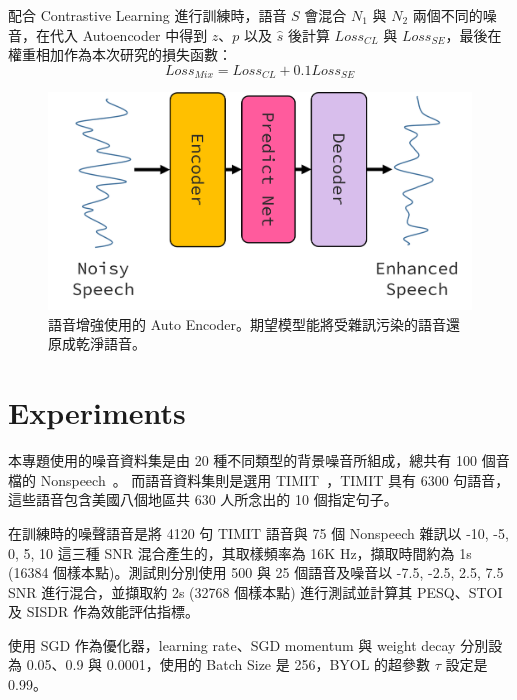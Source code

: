 \documentclass[10pt,twocolumn,letterpaper]{article}
\begin{document}
\begin{CJK}{UTF8}{bkai}
   配合 Contrastive Learning 進行訓練時，語音 $S$ 會混合 $N_1$ 與 $N_2$ 兩個不同的噪音，在代入 Autoencoder
   中得到 $z$、$p$ 以及 $\hat{s}$ 後計算 $Loss_{CL}$ 與 $Loss_{SE}$，最後在權重相加作為本次研究的損失函數：
   \begin{equation}
      \newcommand{\norm}[1]{\left\lVert#1\right\rVert}
      Loss_{Mix}=Loss_{CL}+0.1Loss_{SE}
      \label{eq:Mix-Loss}
   \end{equation}


   \begin{figure}[t]
      \begin{center}
         \includegraphics[width=1\linewidth]{img/auto-encoder.png}
      \end{center}
      \caption{語音增強使用的 Auto Encoder。期望模型能將受雜訊污染的語音還原成乾淨語音。\label{fig:auto-encode}}
   \end{figure}

   \section{Experiments}
   本專題使用的噪音資料集是由 20 種不同類型的背景噪音所組成，總共有 100 個音檔的 Nonspeech~\cite{Nonspeech}。
   而語音資料集則是選用 TIMIT~\cite{TIMIT}，TIMIT 具有 6300 句語音，這些語音包含美國八個地區共 630 人所念出的 10
   個指定句子。

   在訓練時的噪聲語音是將 4120 句 TIMIT 語音與 75 個 Nonspeech 雜訊以 -10, -5, 0, 5, 10 這三種 SNR
   混合產生的，其取樣頻率為 16K Hz，擷取時間約為 1s (16384 個樣本點)。測試則分別使用 500 與 25 個語音及噪音以 -7.5,
   -2.5, 2.5, 7.5 SNR 進行混合，並擷取約 2s (32768 個樣本點) 進行測試並計算其 PESQ\cite{PESQ}、STOI\cite{STOI} 及 SISDR\cite{SISDR}
   作為效能評估指標。

   使用 SGD 作為優化器，learning rate、SGD momentum 與 weight decay 分別設為 0.05、0.9 與 0.0001，使用的
   Batch Size 是 256，BYOL 的超參數 $\tau$ 設定是 0.99。


\end{CJK}
\end{document}
